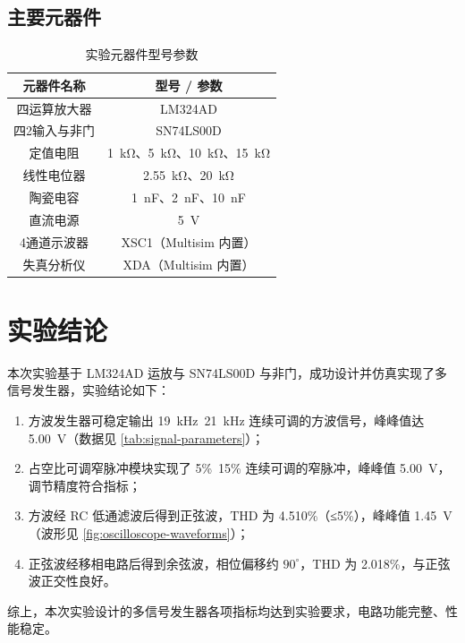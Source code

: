 \documentclass[twoside]{article}
\begin{document}
\subsection{主要元器件}
\begin{table}[H]
    \centering
    \small
    \begin{tabular}{c c}
        \toprule
        \textbf{元器件名称} & \textbf{型号 / 参数} \\
        \midrule
        四运算放大器       & LM324AD \\
        四2输入与非门      & SN74LS00D \\
        定值电阻           & \SI{1}{\kilo\ohm}、\SI{5}{\kilo\ohm}、\SI{10}{\kilo\ohm}、\SI{15}{\kilo\ohm} \\
        线性电位器         & \SI{2.55}{\kilo\ohm}、\SI{20}{\kilo\ohm} \\
        陶瓷电容           & \SI{1}{\nano\farad}、\SI{2}{\nano\farad}、\SI{10}{\nano\farad} \\
        直流电源           & \SI{+5}{\volt} \\
        4通道示波器        & XSC1（Multisim 内置） \\
        失真分析仪         & XDA（Multisim 内置） \\
        \bottomrule
    \end{tabular}
    \caption{实验元器件型号参数}
    \label{tab:components}
\end{table}

\section{实验结论}
本次实验基于 LM324AD 运放与 SN74LS00D 与非门，成功设计并仿真实现了多信号发生器，实验结论如下：
\begin{enumerate}[label=\arabic*., leftmargin=2em, itemsep=0.3em]
    \item 方波发生器可稳定输出 \SI{19}{\kilo\hertz}~\SI{21}{\kilo\hertz} 连续可调的方波信号，峰峰值达 \SI{5.00}{\volt}（数据见 \ref{tab:signal-parameters}）；
    \item 占空比可调窄脉冲模块实现了 5\%~15\% 连续可调的窄脉冲，峰峰值 \SI{5.00}{\volt}，调节精度符合指标；
    \item 方波经 RC 低通滤波后得到正弦波，THD 为 4.510\%（≤5\%），峰峰值 \SI{1.45}{\volt}（波形见 \ref{fig:oscilloscope-waveforms}）；
    \item 正弦波经移相电路后得到余弦波，相位偏移约 $90^\circ$，THD 为 2.018\%，与正弦波正交性良好。
\end{enumerate}
综上，本次实验设计的多信号发生器各项指标均达到实验要求，电路功能完整、性能稳定。
\label{sec:conclusion}
\end{document}
